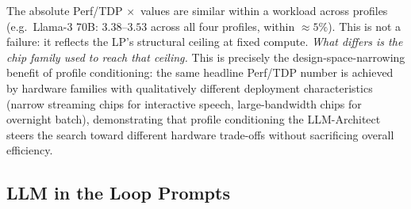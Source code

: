 The absolute Perf/TDP$\,\times$ values are similar within a workload
across profiles (e.g.\ Llama-3 70B: $3.38$–$3.53$ across all four
profiles, within ${\approx}5\%$). This is not a failure: it reflects the LP's structural ceiling at fixed compute. \emph{What differs is the chip family used to reach that ceiling.} This is precisely the design-space-narrowing benefit of profile conditioning: the same headline Perf/TDP number is achieved by hardware families with qualitatively different deployment characteristics (narrow streaming chips for interactive speech, large-bandwidth chips for overnight batch), demonstrating that profile conditioning the LLM-Architect steers the search toward different hardware trade-offs without sacrificing overall efficiency.



\subsection{LLM in the Loop Prompts}
\label{app:prompt}
